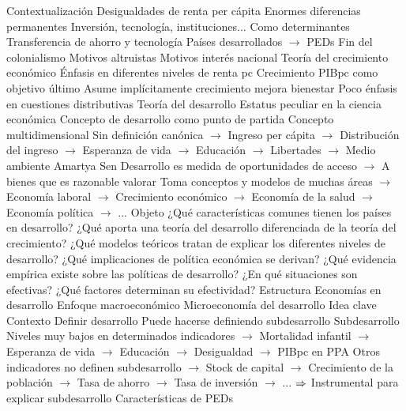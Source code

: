 \documentclass{nuevotema}
\begin{document}
\begin{esquemal}
	\1[] 
		\2 Contextualización
			\3 Desigualdades de renta per cápita
				\4 Enormes diferencias permanentes
				\4 Inversión, tecnología, instituciones...
				\4[] Como determinantes
			\3 Transferencia de ahorro y tecnología
				\4 Países desarrollados $\to$ PEDs
				\4 Fin del colonialismo
				\4 Motivos altruistas
				\4 Motivos interés nacional
			\3 Teoría del crecimiento económico
				\4 Énfasis en diferentes niveles de renta pc
				\4 Crecimiento PIBpc como objetivo último
				\4[] Asume implícitamente crecimiento mejora bienestar
				\4 Poco énfasis en cuestiones distributivas
			\3 Teoría del desarrollo
				\4 Estatus peculiar en la ciencia económica
				\4 Concepto de desarrollo como punto de partida
				\4[] Concepto multidimensional
				\4[] Sin definición canónica
				\4[] $\to$ Ingreso per cápita
				\4[] $\to$ Distribución del ingreso
				\4[] $\to$ Esperanza de vida
				\4[] $\to$ Educación
				\4[] $\to$ Libertades
				\4[] $\to$ Medio ambiente
				\4 Amartya Sen
				\4[] Desarrollo es medida de oportunidades de acceso
				\4[] $\to$ A bienes que es razonable valorar
				\4 Toma conceptos y modelos de muchas áreas
				\4[] $\to$ Economía laboral
				\4[] $\to$ Crecimiento económico
				\4[] $\to$ Economía de la salud
				\4[] $\to$ Economía política
				\4[] $\to$ ...
		\2 Objeto
			\3 ¿Qué características comunes tienen los países en desarrollo?
			\3 ¿Qué aporta una teoría del desarrollo diferenciada de la teoría del crecimiento?
			\3 ¿Qué modelos teóricos tratan de explicar los diferentes niveles de desarrollo?
			\3 ¿Qué implicaciones de política económica se derivan?
			\3 ¿Qué evidencia empírica existe sobre las políticas de desarrollo?
			\3 ¿En qué situaciones son efectivas?
			\3 ¿Qué factores determinan su efectividad?
		\2 Estructura
			\3 Economías en desarrollo
			\3 Enfoque macroeconómico
			\3 Microeconomía del desarrollo
	\1 
		\2 Idea clave
			\3 Contexto
				\4 Definir desarrollo
				\4[] Puede hacerse definiendo subdesarrollo
				\4 Subdesarrollo
				\4[] Niveles muy bajos en determinados indicadores
				\4[] $\to$ Mortalidad infantil
				\4[] $\to$ Esperanza de vida
				\4[] $\to$ Educación
				\4[] $\to$ Desigualdad
				\4[] $\to$ PIBpc en PPA
				\4[] Otros indicadores no definen subdesarrollo
				\4[] $\to$ Stock de capital
				\4[] $\to$ Crecimiento de la población
				\4[] $\to$ Tasa de ahorro
				\4[] $\to$ Tasa de inversión
				\4[] $\to$ ...
				\4[] $\Rightarrow$ Instrumental para explicar subdesarrollo
				\4 Características de PEDs

\end{esquemal}
\end{document}
